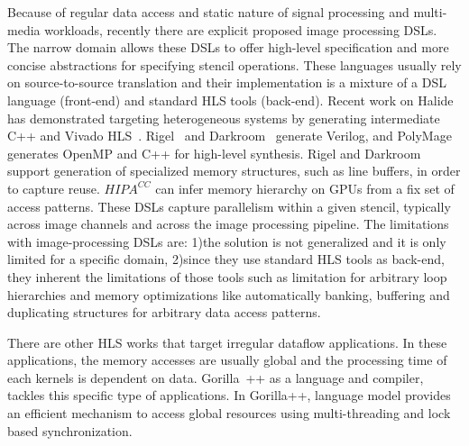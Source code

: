 Because of regular data access and static nature of signal processing and multi-media workloads, recently there are explicit proposed image processing DSLs.
The narrow domain allows these DSLs to offer high-level specification and more concise abstractions for specifying stencil operations.
These languages usually rely on source-to-source translation and their implementation is a mixture of a DSL language (front-end) and standard HLS tools (back-end).
Recent work on Halide~\cite{pldi13halide} has demonstrated targeting heterogeneous systems by generating intermediate C++ and Vivado HLS~\cite{halidefpga}.
Rigel~\cite{hegarty2016rigel} and Darkroom~\cite{hegarty2014darkroom} generate Verilog, and PolyMage~\cite{chugh2016dsl} generates OpenMP and C++ for high-level synthesis.
Rigel and Darkroom support generation of specialized memory structures, such as line buffers, in order to capture reuse. $HIPA^{CC}$ can infer memory hierarchy on GPUs from a fix set of access patterns.
These DSLs capture parallelism within a given stencil, typically across image channels and across the image processing pipeline.
The limitations with image-processing DSLs are: 1)the solution is not generalized and it is only limited for a specific domain, 2)since they use standard HLS tools as back-end, they inherent the limitations of those tools such as limitation for arbitrary loop hierarchies and memory optimizations like automatically banking, buffering and duplicating structures for arbitrary data access patterns. 

There are other HLS works that target irregular dataflow applications.
In these applications, the memory accesses are usually global and the processing time of each kernels is dependent on data. 
Gorilla~\cite{lavasani_thesis}++ as a language and compiler, tackles this specific type of applications.
In Gorilla++, language model provides an efficient mechanism to access global resources using multi-threading and lock based synchronization.

